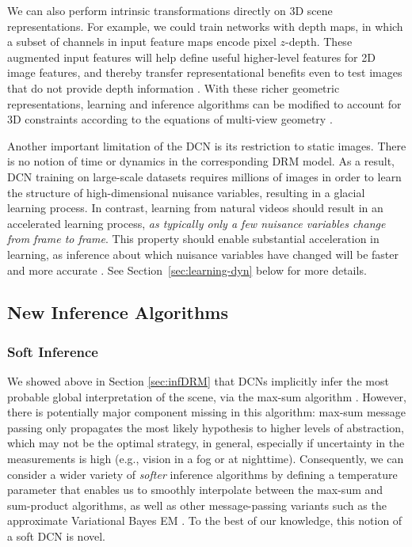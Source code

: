 \documentclass[12pt]{article}
\begin{document}
We can also perform intrinsic transformations directly on 3D scene representations. For example, we could train networks with depth maps, in which a subset of channels in input feature maps encode pixel $z$-depth. These augmented input features will help define useful higher-level features for 2D image features, and thereby transfer representational benefits even to test images that do not provide depth information \cite{hartley2003multiple}. With these richer geometric representations, learning and inference algorithms can be modified to account for 3D constraints according to the equations of multi-view geometry \cite{hartley2003multiple}.

Another important limitation of the DCN is its restriction to static images. There is no notion of time or dynamics in the corresponding DRM model. As a result, DCN training on large-scale datasets requires millions of images in order to learn the structure of high-dimensional nuisance variables, resulting in a glacial learning process. In contrast, learning from natural videos should result in an accelerated learning process, \emph{as typically only a few nuisance variables change from frame to frame}. This property should enable substantial acceleration in learning, as inference about which nuisance variables have changed will be faster and more accurate \cite{michalski2014modeling}.  See Section~\ref{sec:learning-dyn} below for more details.

\subsection{New Inference Algorithms}

\subsubsection{Soft Inference} 

We showed above in Section \ref{sec:infDRM} that DCNs implicitly infer the most probable global interpretation of the scene, via the max-sum algorithm \cite{pearl1988probabilistic}. However, there is potentially major component missing in this algorithm: max-sum message passing only propagates the most likely hypothesis to higher levels of abstraction, which may not be the optimal strategy, in general, especially if uncertainty in the measurements is high (e.g., vision in a fog or at nighttime). Consequently, we can consider a wider variety of \emph{softer} inference algorithms by defining a temperature parameter that enables us to smoothly interpolate between the max-sum and sum-product algorithms, as well as other message-passing variants such as the approximate Variational Bayes EM \cite{bishop2006pattern}. To the best of our knowledge, this notion of a soft DCN is novel.
\end{document}
